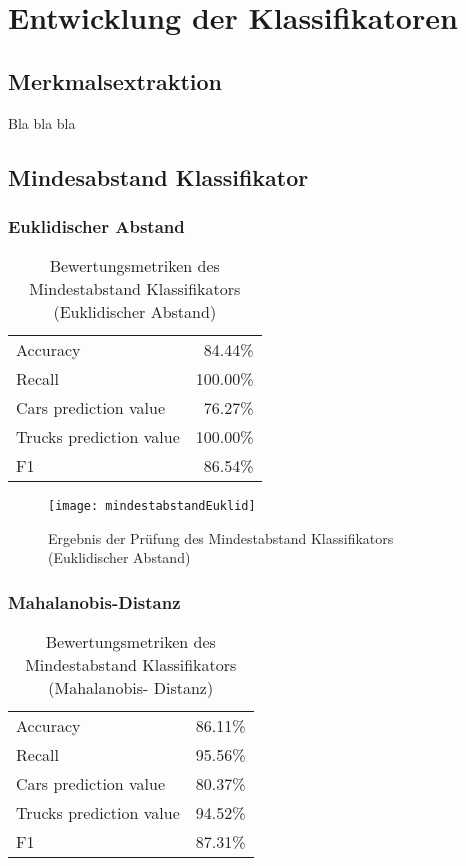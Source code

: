 \chapter{Entwicklung der Klassifikatoren}

\section{Merkmalsextraktion}
Bla bla bla

\section{Mindesabstand Klassifikator}

\subsection{Euklidischer Abstand}

\begin{table}[ht]
\centering
\begin{tabular}{| l | r |}
    \hline
    Accuracy                & 84.44\% \\
    Recall                  & 100.00\% \\
    Cars prediction value   & 76.27\% \\
    Trucks prediction value & 100.00\% \\
    F1                      & 86.54\% \\
    \hline
\end{tabular}
\caption{Bewertungsmetriken des Mindestabstand Klassifikators (Euklidischer
Abstand)}
\label{tab:euklid}
\end{table}

\begin{figure}[ht]
\centering
\texttt{[image: mindestabstandEuklid]}
\caption{Ergebnis der Pr\"ufung des Mindestabstand Klassifikators (Euklidischer
Abstand)}
\label{fig:euklid}
\end{figure}

\subsection{Mahalanobis-Distanz}

\begin{table}[ht]
\centering
\begin{tabular}{| l | r |}
    \hline
    Accuracy                & 86.11\% \\
    Recall                  & 95.56\% \\
    Cars prediction value   & 80.37\% \\
    Trucks prediction value & 94.52\% \\
    F1                      & 87.31\% \\
    \hline
\end{tabular}
\caption{Bewertungsmetriken des Mindestabstand Klassifikators (Mahalanobis-%
Distanz)}
\label{tab:mahalanobis}
\end{table}

